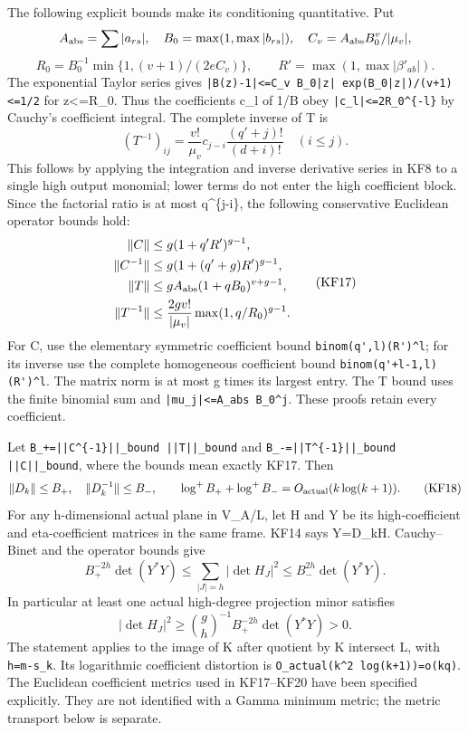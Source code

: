 \documentclass[11pt]{article}
\begin{document}
The following explicit bounds make its conditioning quantitative. Put \[
A_{\rm abs}=\sum|a_{rs}|,\quad B_0=\max(1,\max|b_{rs}|),
\quad C_v=A_{\rm abs}B_0^v/|\mu_v|,
\] \[
R_0=B_0^{-1}\min\{1,(v+1)/(2eC_v)\},\qquad
R'=\max(1,\max|\beta'_{ab}|).
\tag{KF15}
\] The exponential Taylor series gives \nolinkurl{|B(z)-1|<=C_v B_0|z| exp(B_0|z|)/(v+1)<=1/2} for \textbar z\textbar\textless=R\_0. Thus the coefficients c\_l of 1/B obey \nolinkurl{|c_l|<=2R_0^{-l}} by Cauchy's coefficient integral. The complete inverse of T is \[
(T^{-1})_{ij}=\frac{v!}{\mu_v}c_{j-i}
 \frac{(q'+j)!}{(d+i)!}\quad(i\le j).
\tag{KF16}
\] This follows by applying the integration and inverse derivative series in KF8 to a single high output monomial; lower terms do not enter the high coefficient block. Since the factorial ratio is at most q\^{}\{j-i\}, the following conservative Euclidean operator bounds hold: \[
\begin{split}
\|C\|&\le g(1+q'R')^{g-1},\\
\|C^{-1}\|&\le g(1+(q'+g)R')^{g-1},\\
\|T\|&\le gA_{\rm abs}(1+qB_0)^{v+g-1},\\
\|T^{-1}\|&\le\frac{2gv!}{|\mu_v|}
                 \max(1,q/R_0)^{g-1}.
\end{split}\tag{KF17}
\] For C, use the elementary symmetric coefficient bound \nolinkurl{binom(q',l)(R')^l}; for its inverse use the complete homogeneous coefficient bound \nolinkurl{binom(q'+l-1,l)(R')^l}. The matrix norm is at most g times its largest entry. The T bound uses the finite binomial sum and \nolinkurl{|mu_j|<=A_abs B_0^j}. These proofs retain every coefficient.

Let \nolinkurl{B_+=||C^{-1}||_bound ||T||_bound} and \nolinkurl{B_-=||T^{-1}||_bound ||C||_bound}, where the bounds mean exactly KF17. Then \[
\|D_k\|\le B_+,\quad\|D_k^{-1}\|\le B_-,\qquad
\log^+B_++\log^+B_-=O_{\rm actual}(k\log(k+1)).
\tag{KF18}
\] For any h-dimensional actual plane in V\_A/L, let H and Y be its high-coefficient and eta-coefficient matrices in the same frame. KF14 says Y=D\_kH. Cauchy--Binet and the operator bounds give \[
B_+^{-2h}\det(Y^*Y)
\le\sum_{|J|=h}|\det H_J|^2
\le B_-^{2h}\det(Y^*Y).
\tag{KF19}
\] In particular at least one actual high-degree projection minor satisfies \[
|\det H_J|^2\ge
\binom gh^{-1}B_+^{-2h}\det(Y^*Y)>0.
\tag{KF20}
\] The statement applies to the image of K after quotient by K intersect L, with \texttt{h=m-s\_k}. Its logarithmic coefficient distortion is \nolinkurl{O_actual(k^2 log(k+1))=o(kq)}. The Euclidean coefficient metrics used in KF17--KF20 have been specified explicitly. They are not identified with a Gamma minimum metric; the metric transport below is separate.
\end{document}
